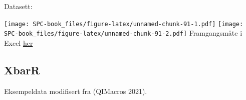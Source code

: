 \documentclass[
]{book}
\begin{document}
Datasett:

\texttt{[image: SPC-book\_files/figure-latex/unnamed-chunk-91-1.pdf]} \texttt{[image: SPC-book\_files/figure-latex/unnamed-chunk-91-2.pdf]}
Framgangsmåte i Excel \href{https://vimeo.com/626386490}{her}

\hypertarget{xbarr}{%
\subsection{XbarR}\label{xbarr}}

Eksempeldata modifisert fra (QIMacros 2021).

\providecommand{\docline}[3]{\noalign{\global\setlength{\arrayrulewidth}{#1}}\arrayrulecolor[HTML]{#2}\cline{#3}}

\setlength{\tabcolsep}{2pt}

\renewcommand*{\arraystretch}{1.5}
\end{document}
